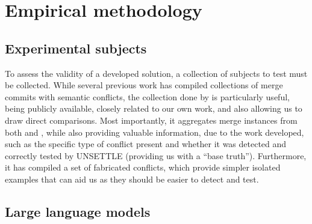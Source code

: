 \chapter{Empirical methodology}\label{chap:chap3}


\section{Experimental subjects}


To assess the validity of a developed solution, a collection of subjects to test must be collected. While several previous work has compiled collections of merge commits with semantic conflicts, the collection done by \citet{kn:nuno} is particularly useful, being publicly available, closely related to our own work, and also allowing us to draw direct comparisons. Most importantly, it aggregates merge instances from both \citet{kn:leuson} and \citet{kn:safemerge}, while also providing valuable information, due to the work developed, such as the specific type of conflict present and whether it was detected and correctly tested by UNSETTLE (providing us with a ``base truth''). Furthermore, it has compiled a set of fabricated conflicts, which provide simpler isolated examples that can aid us as they should be easier to detect and test.


\section{Large language models}


